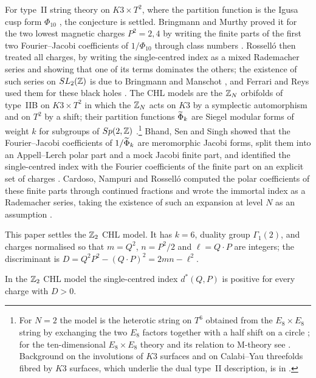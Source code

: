 For type~II string theory on $K3\times T^2$, where the partition function is the Igusa cusp form $\Phi_{10}$ \cite{DVV97,SSY06,GN97}, the conjecture is settled. Bringmann and Murthy proved it for the two lowest magnetic charges $P^2=2,4$ by writing the finite parts of the first two Fourier--Jacobi coefficients of $1/\Phi_{10}$ through class numbers \cite{BM13}. Rossell\'o then treated all charges, by writing the single-centred index as a mixed Rademacher series and showing that one of its terms dominates the others; the existence of such series on $SL_2(\mathbb{Z})$ is due to Bringmann and Manschot \cite{BMa13}, and Ferrari and Reys used them for these black holes \cite{FR17}. The CHL models \cite{CHL95} are the $\mathbb{Z}_N$ orbifolds of type~IIB on $K3\times T^2$ in which the $\mathbb{Z}_N$ acts on $K3$ by a symplectic automorphism and on $T^2$ by a shift; their partition functions $\widetilde\Phi_k$ are Siegel modular forms of weight $k$ for subgroups of $Sp(2,\mathbb{Z})$ \cite{JS06,DJS06,DS06,DN07}.\footnote{For $N=2$ the model is the heterotic string on $T^6$ obtained from the $E_8\times E_8$ string by exchanging the two $E_8$ factors together with a half shift on a circle \cite{CHL95}; for the ten-dimensional $E_8\times E_8$ theory and its relation to M-theory see \cite{SBBT26}. Background on the involutions of $K3$ surfaces and on Calabi--Yau threefolds fibred by $K3$ surfaces, which underlie the dual type~II description, is in \cite{BN26,Bha22}.} Bhand, Sen and Singh showed that the Fourier--Jacobi coefficients of $1/\widetilde\Phi_k$ are meromorphic Jacobi forms, split them into an Appell--Lerch polar part and a mock Jacobi finite part, and identified the single-centred index with the Fourier coefficients of the finite part on an explicit set of charges \cite[Theorem~5.4]{BSS25}. Cardoso, Nampuri and Rossell\'o computed the polar coefficients of these finite parts through continued fractions and wrote the immortal index as a Rademacher series, taking the existence of such an expansion at level $N$ as an assumption \cite{CNR21}.

This paper settles the $\mathbb{Z}_2$ CHL model. It has $k=6$, duality group $\Gamma_1(2)$, and charges normalised so that $m=Q^2$, $n=P^2/2$ and $\ell=Q\cdot P$ are integers; the discriminant is $D=Q^2P^2-(Q\cdot P)^2=2mn-\ell^2$.

\begin{mainthm}\label{thm:all}
In the $\mathbb{Z}_2$ CHL model the single-centred index $d^*(Q,P)$ is positive for every charge with $D>0$.
\end{mainthm}


